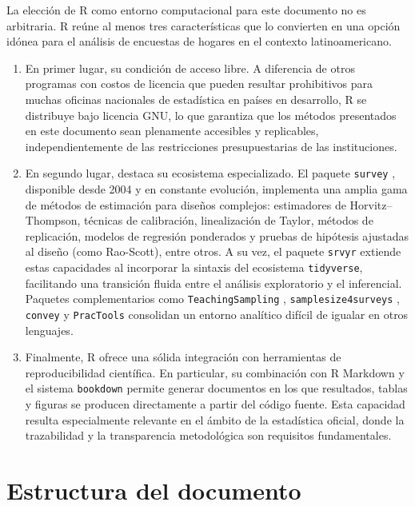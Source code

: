 \documentclass[
  spanish,
  12pt,
]{book}
\begin{document}
La elección de R como entorno computacional para este documento no es arbitraria. R reúne al menos tres características que lo convierten en una opción idónea para el análisis de encuestas de hogares en el contexto latinoamericano.

\begin{enumerate}
\def\labelenumi{\arabic{enumi}.}
\item
  En primer lugar, su condición de acceso libre. A diferencia de otros programas con costos de licencia que pueden resultar prohibitivos para muchas oficinas nacionales de estadística en países en desarrollo, R se distribuye bajo licencia GNU, lo que garantiza que los métodos presentados en este documento sean plenamente accesibles y replicables, independientemente de las restricciones presupuestarias de las instituciones.
\item
  En segundo lugar, destaca su ecosistema especializado. El paquete \texttt{survey} \citep{Lumley2024}, disponible desde 2004 y en constante evolución, implementa una amplia gama de métodos de estimación para diseños complejos: estimadores de Horvitz--Thompson, técnicas de calibración, linealización de Taylor, métodos de replicación, modelos de regresión ponderados y pruebas de hipótesis ajustadas al diseño (como Rao-Scott), entre otros. A su vez, el paquete \texttt{srvyr} \citep{Freedman2024} extiende estas capacidades al incorporar la sintaxis del ecosistema \texttt{tidyverse}, facilitando una transición fluida entre el análisis exploratorio y el inferencial. Paquetes complementarios como \texttt{TeachingSampling} \citep{GutierrezT2020}, \texttt{samplesize4surveys} \citep{Gutierrez2020}, \texttt{convey} \citep{covey2024} y \texttt{PracTools} \citep{Valliant2025} consolidan un entorno analítico difícil de igualar en otros lenguajes.
\item
  Finalmente, R ofrece una sólida integración con herramientas de reproducibilidad científica. En particular, su combinación con R Markdown y el sistema \texttt{bookdown} permite generar documentos en los que resultados, tablas y figuras se producen directamente a partir del código fuente. Esta capacidad resulta especialmente relevante en el ámbito de la estadística oficial, donde la trazabilidad y la transparencia metodológica son requisitos fundamentales.
\end{enumerate}

\section{Estructura del documento}\label{estructura-del-documento}
\end{document}
